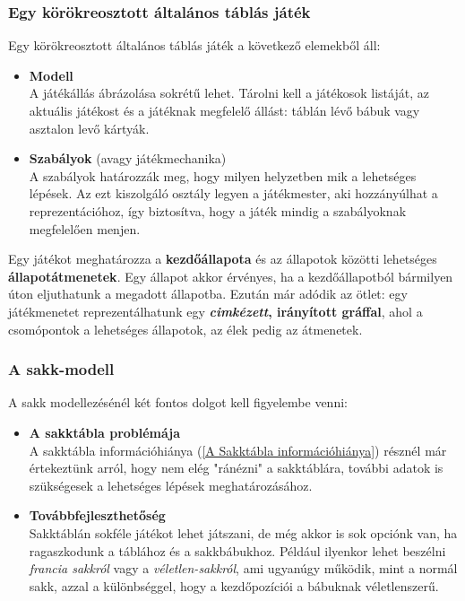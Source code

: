 \documentclass[twoside, a4paper, 12pt]{article}
\begin{document}
\subsubsection{Egy körökreosztott általános táblás játék}
Egy körökreosztott általános táblás játék a következő elemekből áll:

\begin{itemize}
	\item \textbf{Modell} \\
	A játékállás ábrázolása sokrétű lehet. Tárolni kell a játékosok listáját, az aktuális játékost és a játéknak megfelelő állást: táblán lévő bábuk vagy asztalon levő kártyák.
	
	\item \textbf{Szabályok} (avagy játékmechanika) \\
	A szabályok határozzák meg, hogy milyen helyzetben mik a lehetséges lépések. Az ezt kiszolgáló osztály legyen a játékmester, aki hozzányúlhat a reprezentációhoz, így biztosítva, hogy a játék mindig a szabályoknak megfelelően menjen.
\end{itemize}

Egy játékot meghatározza a \textbf{kezdőállapota} és az állapotok közötti lehetséges \textbf{állapotátmenetek}. Egy állapot akkor érvényes, ha a kezdőállapotból bármilyen úton eljuthatunk a megadott állapotba. Ezután már adódik az ötlet: egy játékmenetet reprezentálhatunk egy \textbf{\textit{cimkézett}, irányított gráffal}, ahol a csomópontok a lehetséges állapotok, az élek pedig az átmenetek.

\subsubsection{A sakk-modell}
A sakk modellezésénél két fontos dolgot kell figyelembe venni:
\begin{itemize}
	\item \textbf{A sakktábla problémája} \\
	A sakktábla információhiánya (\ref{A Sakktábla információhiánya}) résznél már értekeztünk arról, hogy nem elég "ránézni" a sakktáblára, további adatok is szükségesek a lehetséges lépések meghatározásához.
	
	\item \textbf{Továbbfejleszthetőség} \\
	Sakktáblán sokféle játékot lehet játszani, de még akkor is sok opciónk van, ha ragaszkodunk a táblához és a sakkbábukhoz. Például ilyenkor lehet beszélni \textit{francia sakkról} vagy a \textit{véletlen-sakkról}, ami ugyanúgy működik, mint a normál sakk, azzal a különbséggel, hogy a kezdőpozíciói a bábuknak véletlenszerű.
\end{itemize}
\end{document}
